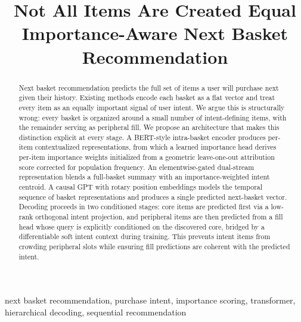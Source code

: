 \documentclass[conference]{IEEEtran}
\begin{document}
\title{Not All Items Are Created Equal\\
\vspace{0.5cm}
\large Importance-Aware Next Basket Recommendation}

\author{
\and
{}
\and
{}
\and
{}
}

\maketitle

\begin{abstract}
Next basket recommendation predicts the full set of items a user will
purchase next given their history. Existing methods encode each basket
as a flat vector and treat every item as an equally important signal of
user intent. We argue this is structurally wrong: every basket is
organized around a small number of intent-defining items, with the
remainder serving as peripheral fill. We propose an architecture that
makes this distinction explicit at every stage. A BERT-style intra-basket
encoder produces per-item contextualized representations, from which a
learned importance head derives per-item importance weights initialized
from a geometric leave-one-out attribution score corrected for
population frequency. An elementwise-gated dual-stream representation
blends a full-basket summary with an importance-weighted intent centroid.
A causal GPT with rotary position embeddings models the temporal sequence
of basket representations and produces a single predicted next-basket
vector. Decoding proceeds in two conditioned stages: core items are
predicted first via a low-rank orthogonal intent projection, and
peripheral items are then predicted from a fill head whose query is
explicitly conditioned on the discovered core, bridged by a
differentiable soft intent context during training. This prevents intent
items from crowding peripheral slots while ensuring fill predictions are
coherent with the predicted intent.
\end{abstract}

\begin{IEEEkeywords}
next basket recommendation, purchase intent, importance scoring,
transformer, hierarchical decoding, sequential recommendation
\end{IEEEkeywords}
\end{document}
